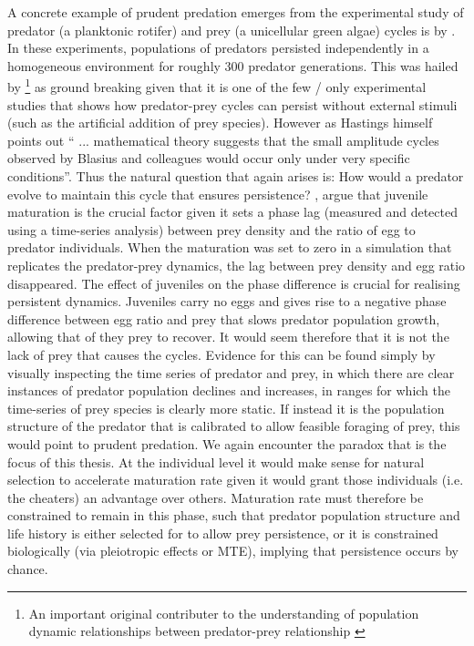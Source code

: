 \documentclass[a4paper]{report}
\begin{document}
A concrete example of prudent predation emerges from the experimental study of predator (a planktonic rotifer) and prey (a unicellular green algae) cycles is by \citep{Blasius2020}. In these experiments, populations of predators persisted independently in a homogeneous environment for roughly 300 predator generations. This was hailed by \citep{Hastings2020}\footnote{An important original contributer to the understanding of population dynamic relationships between predator-prey relationship \citep{Hastings1977}} as ground breaking given that it is one of the few / only experimental studies that shows how predator-prey cycles can persist without external stimuli (such as the artificial addition of prey species). However as Hastings himself points out “ ... mathematical theory suggests that the small amplitude cycles observed by Blasius and colleagues would occur only under very specific conditions”. Thus the natural question that again arises is: How would a predator evolve to maintain this cycle that ensures persistence? \citep{Blasius2020}, argue that juvenile maturation is the crucial factor given it sets a phase lag (measured and detected using a time-series analysis) between prey density and the ratio of egg to predator individuals. When the maturation was set to zero in a simulation that replicates the predator-prey dynamics, the lag between prey density and egg ratio disappeared. The effect of juveniles on the phase difference is crucial for realising persistent dynamics. Juveniles carry no eggs and gives rise to a negative phase difference between egg ratio and prey that slows predator population growth, allowing that of they prey to recover. It would seem therefore that it is not the lack of prey that causes the cycles. Evidence for this can be found simply by visually inspecting the time series of predator and prey, in which there are clear instances of predator population declines and increases, in ranges for which the time-series of prey species is clearly more static. If instead it is the population structure of the predator that is calibrated to allow feasible foraging of prey, this would point to prudent predation. We again encounter the paradox that is the focus of this thesis. At the individual level it would make sense for natural selection to accelerate maturation rate given it would grant those individuals (i.e. the cheaters) an advantage over others. Maturation rate must therefore be constrained to remain in this phase, such that predator population structure and life history is either selected for to allow prey persistence, or it is constrained biologically (via pleiotropic effects or MTE), implying that persistence occurs by chance.\\
\end{document}
